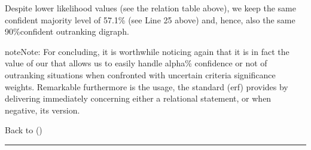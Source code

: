 \documentclass[a4paper,12pt,english]{sphinxhowto}
\begin{document}
\begin{sphinxVerbatim}[commandchars=\\\{\},numbers=left,firstnumber=1,stepnumber=1]
\end{sphinxVerbatim}
\sphinxresetverbatimhllines

\sphinxAtStartPar
Despite lower likelihood values (see the  relation table above), we keep the same confident majority level of 57.1\% (see Line 25 above) and, hence, also the same 90\%\sphinxhyphen{}confident outranking digraph.

\begin{sphinxadmonition}{note}{Note:}
\sphinxAtStartPar
For concluding, it is worthwhile noticing again that it is in fact the  value of our  that allows us to easily handle alpha\% confidence or not of outranking situations when confronted with uncertain criteria significance weights. Remarkable furthermore is the usage, the standard  (erf) provides by delivering  immediately concerning either a  relational statement, or when negative, its  version.
\end{sphinxadmonition}

\sphinxAtStartPar
Back to {\hyperref[\detokenize{pearls:pearls-label}]{}} ()


\bigskip\hrule\bigskip
\end{document}
